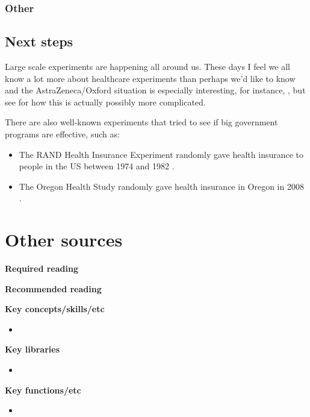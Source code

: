 \documentclass[
]{book}
\providecommand{\tightlist}{%
  \setlength{\itemsep}{0pt}\setlength{\parskip}{0pt}}
\begin{document}
\hypertarget{other-2}{%
\subsection{Other}\label{other-2}}

\hypertarget{next-steps-1}{%
\section{Next steps}\label{next-steps-1}}

Large scale experiments are happening all around us. These days I feel we all know a lot more about healthcare experiments than perhaps we'd like to know and the AstraZeneca/Oxford situation is especially interesting, for instance, \citet{OxfordAstraZeneca}, but see \citet{Bastian2020} for how this is actually possibly more complicated.

There are also well-known experiments that tried to see if big government programs are effective, such as:

\begin{itemize}
\tightlist
\item
  The RAND Health Insurance Experiment randomly gave health insurance to people in the US between 1974 and 1982 \citep{randhealth}.
\item
  The Oregon Health Study randomly gave health insurance in Oregon in 2008 \citep{finkelstein2012oregon}.
\end{itemize}

\hypertarget{other-sources}{%
\chapter{Other sources}\label{other-sources}}

\textbf{Required reading}

\textbf{Recommended reading}

\textbf{Key concepts/skills/etc}

\begin{itemize}
\item
\end{itemize}

\textbf{Key libraries}

\begin{itemize}
\item
\end{itemize}

\textbf{Key functions/etc}

\begin{itemize}
\item
\end{itemize}
\end{document}
